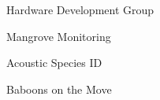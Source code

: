 \item Hardware Development Group
\item Mangrove Monitoring
\item Acoustic Species ID
\item Baboons on the Move
